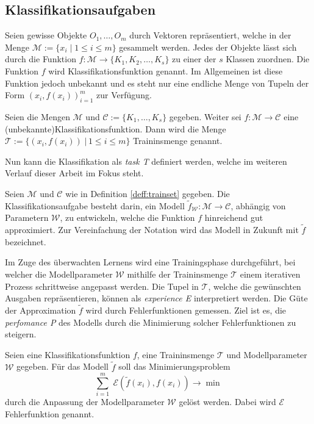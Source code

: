 \subsection{Klassifikationsaufgaben}
\label{abs:classtask}
Seien gewisse Objekte $O_1, \ldots, O_m$ durch Vektoren repräsentiert, welche in der Menge $\mathcal{M}:=\{x_i \; | \; 1 \leq i \leq m \}$ gesammelt werden. Jedes der Objekte lässt sich durch die Funktion $f:\mathcal{M} \rightarrow \{K_1, K_2, \ldots, K_s\}$ zu einer der $s$ Klassen zuordnen. Die Funktion $f$ wird Klassifikationsfunktion genannt. Im Allgemeinen ist diese Funktion jedoch unbekannt und es steht nur eine endliche Menge von Tupeln der Form $(x_i, f(x_i))_{i=1}^m$ zur Verfügung. 
\begin{defi}[Traininsmenge]
    \label{deff:trainset}
    Seien die Mengen $\mathcal{M}$ und $\mathcal{C}:=\{K_1, \ldots, K_s \}$ gegeben. Weiter sei $f: \mathcal{M} \rightarrow \mathcal{C}$ eine (unbekannte)Klassifikationsfunktion. Dann wird die Menge $\mathcal{T}:=\{(x_i, f(x_i))\; | \, 1 \leq i \leq m\}$ Traininsmenge genannt. 
\end{defi}
Nun kann die Klassifikation als \textit{task T} definiert werden, welche im weiteren Verlauf dieser Arbeit im Fokus steht.
\begin{defi}[Klassifikationsaufgabe]
    Seien $\mathcal{M}$ und $\mathcal{C}$ wie in Definition \ref{deff:trainset} gegeben. Die Klassifikationsaufgabe besteht darin, ein Modell $\tilde{f}_{\mathcal{W}}:\mathcal{M} \rightarrow \mathcal{C}$, abhängig von Parametern $\mathcal{W}$, zu entwickeln, welche die Funktion $f$ hinreichend gut approximiert. Zur Vereinfachung der Notation wird das Modell in Zukunft mit $\tilde{f}$ bezeichnet.
\end{defi}
Im Zuge des überwachten Lernens wird eine Trainingsphase durchgeführt, bei welcher die Modellparameter $\mathcal{W}$ mithilfe der Traininsmenge $\mathcal{T}$ einem iterativen Prozess schrittweise angepasst werden. Die Tupel in $\mathcal{T}$, welche die gewünschten Ausgaben repräsentieren, können als \textit{experience E} interpretiert werden.
Die Güte der Approximation $\tilde{f}$ wird durch Fehlerfunktionen gemessen. Ziel ist es, die \textit{perfomance P} des Modells durch die Minimierung solcher Fehlerfunktionen zu steigern.  
\begin{defi}
    Seien eine Klassifikationsfunktion $f$, eine Traininsmenge $\mathcal{T}$ und Modellparameter $\mathcal{W}$ gegeben. Für das Modell $\tilde{f}$ soll das Minimierungsproblem 
    \begin{equation}
        \label{eq:opt_fund_abs}
        \sum_{i=1}^m \; \mathcal{E}(\tilde{f}(x_i),f(x_i)) \rightarrow \min
    \end{equation}
    durch die Anpassung der Modellparameter $\mathcal{W}$ gelöst werden. Dabei wird $\mathcal{E}$ Fehlerfunktion genannt.
\end{defi}
